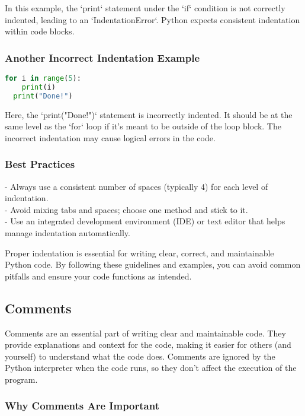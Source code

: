 In this example, the `print` statement under the `if` condition is not correctly indented, leading to an `IndentationError`. Python expects consistent indentation within code blocks.

\subsubsection{Another Incorrect Indentation Example}

\begin{lstlisting}[language=Python, caption=Another Incorrect Indentation Example]
for i in range(5):
    print(i)
  print("Done!")
\end{lstlisting}

Here, the `print("Done!")` statement is incorrectly indented. It should be at the same level as the `for` loop if it's meant to be outside of the loop block. The incorrect indentation may cause logical errors in the code.

\subsubsection{Best Practices}

- Always use a consistent number of spaces (typically 4) for each level of indentation.
\\
- Avoid mixing tabs and spaces; choose one method and stick to it.
\\
- Use an integrated development environment (IDE) or text editor that helps manage indentation automatically.

Proper indentation is essential for writing clear, correct, and maintainable Python code. By following these guidelines and examples, you can avoid common pitfalls and ensure your code functions as intended.

\subsection{Comments}

Comments are an essential part of writing clear and maintainable code. They provide explanations and context for the code, making it easier for others (and yourself) to understand what the code does. Comments are ignored by the Python interpreter when the code runs, so they don't affect the execution of the program.

\subsubsection{Why Comments Are Important}

